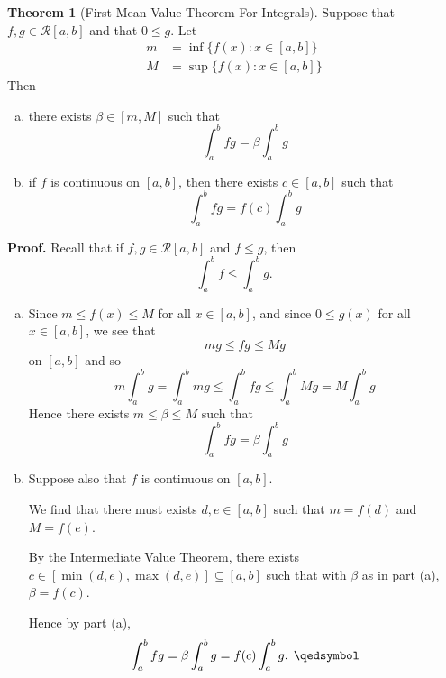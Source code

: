 \documentclass[11pt]{article}
\theoremstyle{definition}
\newtheorem{thm}{Theorem}[section]
\begin{document}
\begin{thm}[First Mean Value Theorem For Integrals] 
Suppose that $f, g \in \mathcal{R}[a, b]$ and that $0 \leq g$. Let 
\begin{align*}
m & = \inf\{f(x) : x \in [a, b]\} \\
M & = \sup\{f(x) : x \in [a, b]\}
\end{align*}
Then
\begin{enumerate}[(a)] \vspace{-0.2cm}
\item there exists $\beta \in [m, M]$ such that
$$\int_a^b fg = \beta \int_a^b g$$
\item if $f$ is continuous on $[a, b]$, then there exists $c \in [a, b]$ such that
$$\int_a^b fg = f(c) \int_a^b g$$
\end{enumerate}
\end{thm}
\textbf{Proof.} Recall that if $f, g \in \mathcal{R}[a, b]$ and $f \leq g$, then
$$\int_a^b f \leq \int_a^b g \text{.}$$
\begin{enumerate}[(a)]
\item Since $m \leq f(x) \leq M$ for all $x \in [a, b]$, and since $0 \leq g(x)$ for all $x \in [a, b]$, we see that
$$mg \leq fg \leq Mg$$
on $[a, b]$ and so
$$m\int_a^b g = \int_a^b mg \leq \int_a^b fg \leq \int_a^b Mg = M\int_a^b g$$
Hence there exists $m \leq \beta \leq M$ such that
$$\int_a^b fg = \beta \int_a^b g$$
\item Suppose also that $f$ is continuous on $[a, b]$. 

We find that there must exists $d, e \in [a, b]$ such that $m = f(d)$ and $M = f(e)$. 

By the Intermediate Value Theorem, there exists $c \in [\min(d, e), \max(d, e)] \subseteq [a, b]$ such that with $\beta$ as in part (a), $\beta = f(c)$. 

Hence by part (a),
$$\int_a^b fg = \beta \int_a^b g = f(c) \int_a^b g \text{. } \qedsymbol$$
\end{enumerate}
\end{document}
